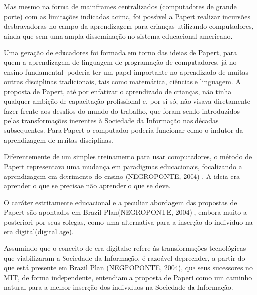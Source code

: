 \documentclass[
12pt,		%
openright,	%
twoside,  %
a4paper,			%
chapter=TITLE,		%
english,			%
french,				%
spanish,			%
brazil				%
]{USPSC-classe/USPSC}
\begin{document}
Mas mesmo na forma de mainframes centralizados (computadores de grande porte) com as limita\c{c}\~oes indicadas acima, foi poss\'{\i}vel a Papert realizar incurs\~oes desbravadoras no campo da aprendizagem para crian\c{c}as utilizando computadores, ainda que sem uma ampla dissemina\c{c}\~ao no sistema educacional americano.




Uma gera\c{c}\~ao de educadores foi formada em torno das ideias de Papert, para quem a aprendizagem de linguagem de programa\c{c}\~ao de computadores, j\'a no ensino fundamental, poderia ter um papel importante no aprendizado de muitas outras disciplinas tradicionais, tais como matem\'atica, ci\^encias e linguagem. A proposta de Papert, at\'e por enfatizar o aprendizado de crian\c{c}as, n\~ao tinha qualquer ambi\c{c}\~ao de capacita\c{c}\~ao profissional e, por si s\'o, n\~ao visava diretamente fazer frente aos desafios do \textquotedbl mundo do trabalho\textquotedbl , que foram sendo introduzidos pelas transforma\c{c}\~oes inerentes \`a Sociedade da Informa\c{c}\~ao nas d\'ecadas subsequentes. Para Papert o computador poderia funcionar como o indutor da aprendizagem de muitas disciplinas.




Diferentemente de um simples treinamento para usar computadores, o m\'etodo de Papert representava uma mudan\c{c}a em paradigmas educacionais, focalizando a aprendizagem em detrimento do ensino  (NEGROPONTE, 2004) . A ideia era \textquotedbl aprender o que se precisa\textquotedbl  e n\~ao \textquotedbl aprender o que se deve\textquotedbl .




O car\'ater estritamente educacional e a peculiar abordagem das propostas de Papert s\~ao apontados em \textquotedbl Brazil Plan\textquotedbl   (NEGROPONTE, 2004) , embora muito a posteriori por seus colegas, como uma alternativa para a inser\c{c}\~ao do indiv\'{\i}duo na \textquotedbl era digital\textquotedbl  (digital age).




Assumindo que o conceito de \textquotedbl era digital\textquotedbl  se refere \`as transforma\c{c}\~oes tecnol\'ogicas que viabilizaram a  \textquotedbl Sociedade da Informa\c{c}\~ao\textquotedbl ,  \'e razo\'avel depreender, a partir do que est\'a presente em Brazil Plan  (NEGROPONTE, 2004), que seus sucessores no MIT, de forma independente, entendiam a proposta de Papert como um caminho natural para a melhor inser\c{c}\~ao dos indiv\'{\i}duos na Sociedade da Informa\c{c}\~ao.
\end{document}
